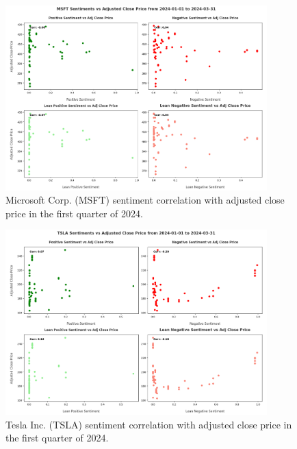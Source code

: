 \begin{figure}[htbp]
  \centering
  \includegraphics[width=0.9\textwidth]{img/experiment-stock/msft-corr-a.pdf}
  \caption{Microsoft Corp. (MSFT) sentiment correlation with adjusted close price in the first quarter of 2024.}
  \label{fig:elsa-experiment-stock-msft-corr}
\end{figure}

\begin{figure}[htbp]
  \centering
  \includegraphics[width=0.9\textwidth]{img/experiment-stock/tsla-corr-a.pdf}
  \caption{Tesla Inc. (TSLA) sentiment correlation with adjusted close price in the first quarter of 2024.}
  \label{fig:elsa-experiment-stock-tsla-corr}
\end{figure}
